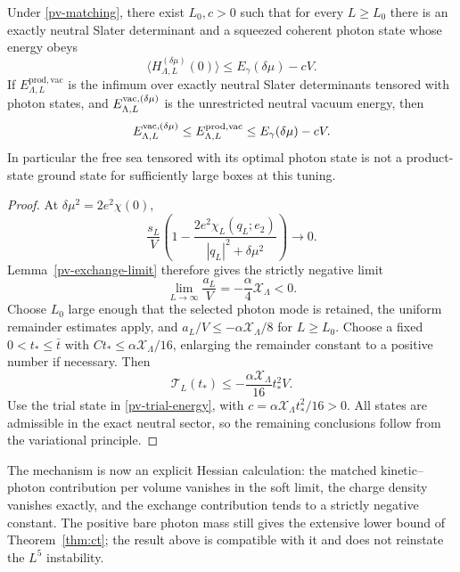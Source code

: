 \begin{theorem}
\label{pv-instability-theorem}
Under \eqref{pv-matching}, there exist \(L_0,c>0\) such that for every
\(L\geq L_0\) there is an exactly neutral Slater determinant and a
squeezed coherent photon state whose energy obeys
\begin{equation}
 \langle H^{(\delta\mu)}_{\Lambda,L}(0)\rangle
 \leq E_\gamma(\delta\mu)-cV.
 \label{pv-extensive-lowering}
\end{equation}
If \(E^{\mathrm{prod,vac}}_{\Lambda,L}\) is the infimum over exactly
neutral Slater determinants tensored with photon states, and
\(E^{\mathrm{vac},(\delta\mu)}_{\Lambda,L}\) is the unrestricted neutral
vacuum energy, then
\begin{equation}
 E^{\mathrm{vac},(\delta\mu)}_{\Lambda,L}
 \leq E^{\mathrm{prod,vac}}_{\Lambda,L}
 \leq E_\gamma(\delta\mu)-cV.
 \label{pv-vacuum-bounds}
\end{equation}
In particular the free sea tensored with its optimal photon state is not
a product-state ground state for sufficiently large boxes at this tuning.
\end{theorem}
\begin{proof}
At \(\delta\mu^2=2e^2\chi(0)\),
\[
 \frac{s_L}{V}\left(1-
       \frac{2e^2\chi_L(q_L;e_2)}{|q_L|^2+\delta\mu^2}\right)
 \longrightarrow0.
\]
Lemma~\ref{pv-exchange-limit} therefore gives the strictly negative limit
\begin{equation}
 \lim_{L\to\infty}\frac{a_L}{V}
 =-\frac\alpha4\mathcal X_\Lambda<0.
 \label{pv-negative-hessian-limit}
\end{equation}
Choose \(L_0\) large enough that the selected photon mode is retained,
the uniform remainder estimates apply, and
\(a_L/V\leq-\alpha\mathcal X_\Lambda/8\) for \(L\geq L_0\).
Choose a fixed \(0<t_*\leq\bar t\) with
\(Ct_*\leq\alpha\mathcal X_\Lambda/16\), enlarging the remainder
constant to a positive number if necessary. Then
\[
 \mathcal T_L(t_*)
 \leq-\frac{\alpha\mathcal X_\Lambda}{16}t_*^2V.
\]
Use the trial state in \eqref{pv-trial-energy}, with
\(c=\alpha\mathcal X_\Lambda t_*^2/16>0\). All states are admissible
in the exact neutral sector, so the remaining conclusions follow from
the variational principle.
\end{proof}

The mechanism is now an explicit Hessian calculation: the matched
kinetic--photon contribution per volume vanishes in the soft limit, the
charge density vanishes exactly, and the exchange contribution tends to
a strictly negative constant. The positive bare photon mass still gives
the extensive lower bound of Theorem~\ref{thm:ct}; the result above is
compatible with it and does not reinstate the \(L^5\) instability.

